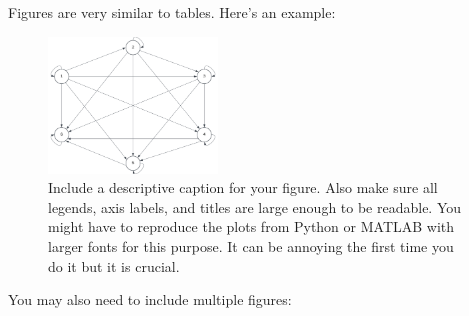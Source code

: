 \documentclass[11pt]{amsart}
\begin{document}
Figures are very similar to tables. Here's an example: 

\begin{figure}[htp]
    \centering
    \includegraphics[width=0.4\textwidth]{./Figs/fig1.png}
    \caption{Include a descriptive caption for your figure. Also make sure all 
    legends, axis labels, and titles are large enough to be readable. You might have 
    to reproduce the plots from Python or MATLAB with larger fonts for this purpose. It 
    can be annoying the first time you do it but it is crucial.}
    \label{fig:meaningful-label}
\end{figure}


You may also need to include multiple figures: 
\end{document}
